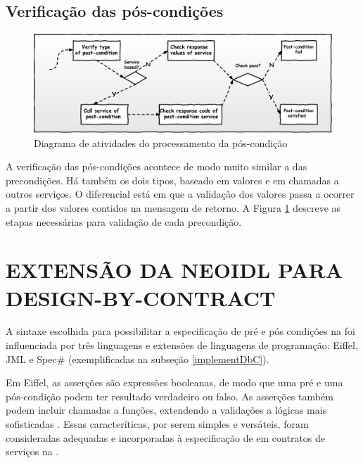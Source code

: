 \subsection{Verificação das pós-condições}
\vspace{-6mm}

\begin{figure}[!htb]
\centering
\includegraphics[width=140mm,trim = 0mm 0mm 0mm
0mm,clip]{img/FluxoPostcondicoes.pdf}
\vspace{-6mm}
\caption{Diagrama de atividades do processamento da pós-condição}
\label{FigServicePostcondition}
\end{figure}

A verificação das pós-condições acontece de modo muito similar a das
precondições. Há também os dois tipos, baseado em valores e em chamadas a
outros serviços. O diferencial está em que a validação dos valores passa a
ocorrer a partir dos valores contidos na mensagem de retorno. A Figura
\ref{FigServicePostcondition} descreve as etapas necessárias para validação de
cada precondição.


\section{EXTENSÃO DA NEOIDL PARA DESIGN-BY-CONTRACT}
\label{extensaoNeoIDL-DbC}

A sintaxe escolhida para possibilitar a especificação de pré e pós condições
na \neoidl{} foi influenciada por três linguagens e extensões de linguagens de
programação: Eiffel, JML e Spec\# (exemplificadas na subseção
\ref{implementDbC}). 

Em Eiffel, as asserções são expressões booleanas, de modo que uma pré e uma
pós-condição podem ter resultado verdadeiro ou falso. As asserções também podem
incluir chamadas a funções, extendendo a validações a lógicas mais sofisticadas
\cite{meyer1992applying}. Essas caracteríticas, por serem simples e versáteis,
foram consideradas adequadas e incorporadas à especificação de
\designbycontract{} em contratos de serviços na \neoidl{}.

